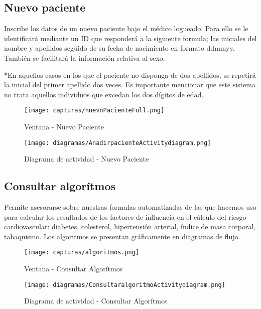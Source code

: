 \documentclass[11pt,spanish,
		listoftables,listoffigures]
		{tfgplantilla}
\begin{document}
\vfill
\subsection {Nuevo paciente}

Inscribe los datos de un nuevo paciente bajo el médico logueado. Para ello se le identificará mediante un ID que responderá a la siguiente formula; las iniciales del nombre y apellidos seguido de su fecha de nacimiento en formato ddmmyy. También se facilitará la información relativa al sexo.

*En aquellos casos en los que el paciente no disponga de dos apellidos, se repetirá la inicial del primer apellido dos veces. Es importante mencionar que este sistema no trata aquellos individuos que excedan los dos dígitos de edad.

\begin{figure}[H]
\centering
\texttt{[image: capturas/nuevoPacienteFull.png]}
\caption{Ventana - Nuevo Paciente}
\end{figure}

\begin{figure}[H]
\centering
\texttt{[image: diagramas/AnadirpacienteActivitydiagram.png]}
\caption{Diagrama de actividad - Nuevo Paciente}
\end{figure}

\subsection {Consultar algorítmos}

Permite asesorarse sobre nuestras formulas automatizadas de las que hacemos uso para calcular los resultados de los factores de influencia en el cálculo del riesgo cardiovascular: diabetes, colesterol, hipertensión arterial, índice de masa corporal, tabaquismo.
Los algoritmos se presentan gráficamente en diagramas de flujo.

\begin{figure}[H]
\centering
\texttt{[image: capturas/algoritmos.png]}
\caption{Ventana - Consultar Algorítmos}
\end{figure}

\begin{figure}[H]
\centering
\texttt{[image: diagramas/ConsultaralgoritmoActivitydiagram.png]}
\caption{Diagrama de actividad -  Consultar Algorítmos}
\end{figure}

\vfill
\end{document}
